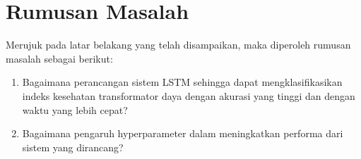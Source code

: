 

\section{Rumusan Masalah}
Merujuk pada latar belakang yang telah disampaikan, maka diperoleh rumusan masalah sebagai berikut:
\begin{enumerate}
	\item Bagaimana perancangan sistem LSTM sehingga dapat mengklasifikasikan indeks kesehatan transformator daya dengan akurasi yang tinggi dan dengan waktu yang lebih cepat?
	\item Bagaimana pengaruh hyperparameter dalam meningkatkan performa dari sistem yang dirancang?
\end{enumerate}


